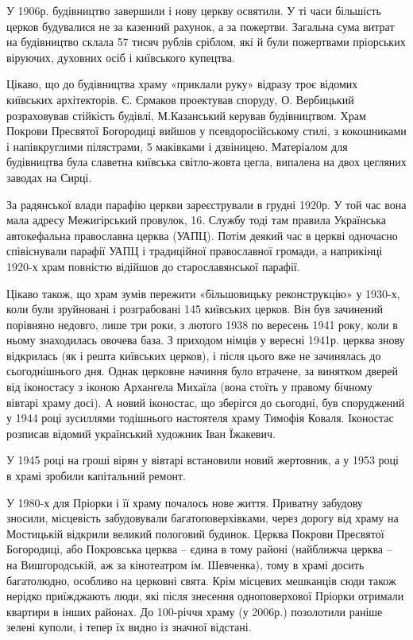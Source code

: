 У 1906р. будівництво завершили і нову церкву освятили. У ті часи більшість
церков будувалися не за казенний рахунок, а за пожертви. Загальна сума витрат
на будівництво склала 57 тисяч рублів сріблом, які й були пожертвами пріорських
віруючих, духовних осіб і київського купецтва. 

Цікаво, що до будівництва храму «приклали руку» відразу троє відомих київських
архітекторів. Є. Єрмаков проектував споруду, О. Вербицький розраховував
стійкість будівлі, М.Казанський керував будівництвом. Храм Покрови Пресвятої
Богородиці вийшов у псевдоросійському стилі, з кокошниками і напівкруглими
пілястрами, 5 маківками і дзвіницею. Матеріалом для будівництва була славетна
київська світло-жовта цегла, випалена на двох цегляних заводах на Сирці. 

За радянської влади парафію церкви зареєстрували в грудні 1920р. У той час вона
мала адресу Межигірський провулок, 16. Службу тоді там правила Українська
автокефальна православна церква (УАПЦ). Потім деякий час в церкві одночасно
співіснували парафії УАПЦ і традиційної православної громади, а наприкінці
1920-х храм повністю відійшов до старославянської парафії. 

Цікаво також, що храм зумів пережити «більшовицьку реконструкцію» у 1930-х,
коли були зруйновані і розграбовані 145 київських церков. Він був зачинений
порівняно недовго, лише три роки, з лютого 1938 по вересень 1941 року, коли в
ньому знаходилась овочева база. З приходом німців у вересні 1941р. церква знову
відкрилась (як і решта київських церков), і після цього вже не зачинялась до
сьогоднішнього дня. Однак церковне начиння було втрачене, за винятком дверей
від іконостасу з іконою Архангела Михаїла (вона стоїть у правому бічному
вівтарі храму досі). А новий іконостас, що зберігся до сьогодні, був
споруджений у 1944 році зусиллями тодішнього настоятеля храму Тимофія Коваля.
Іконостас розписав відомий український художник Іван Їжакевич.  

У 1945 році на гроші вірян у вівтарі встановили новий жертовник, а у 1953 році
в храмі зробили капітальний ремонт.

У 1980-х для Пріорки і її храму почалось нове життя. Приватну забудову зносили,
місцевість забудовували багатоповерхівками, через дорогу від храму на
Мостицькій відкрили великий пологовий будинок. Церква Покрови Пресвятої
Богородиці, або Покровська церква – єдина в тому районі (найближча церква – на
Вишгородській, аж за кінотеатром ім. Шевченка), тому в храмі досить багатолюдно,
особливо на церковні свята. Крім місцевих мешканців сюди також нерідко
приїжджають люди, які після знесення одноповерхової Пріорки отримали квартири в
інших районах. До 100-річчя храму (у 2006р.) позолотили раніше зелені куполи, і
тепер їх видно із значної відстані.
